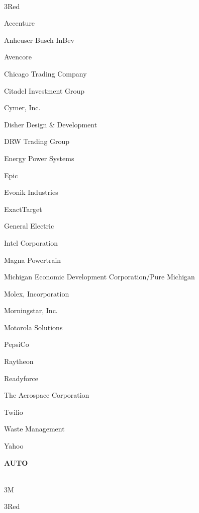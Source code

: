 \documentclass[twoside]{article}
\begin{document}
\begin{center}
\begin{multicols}{5}
        \vspace{-1em}
        ~\hrulefill~
        \vspace{-.9em}
        \begin{FlushLeft}
        \begin{compactitem}
        \item 3Red
\item Accenture
\item Anheuser Busch InBev
\item Avencore
\item Chicago Trading Company
\item Citadel Investment Group
\item Cymer, Inc.
\item Disher Design \& Development
\item DRW Trading Group
\item Energy Power Systems
\item Epic
\item Evonik Industries
\item ExactTarget
\item General Electric
\item Intel Corporation
\item Magna Powertrain
\item Michigan Economic Development Corporation/Pure Michigan
\item Molex, Incorporation
\item Morningstar, Inc.
\item Motorola Solutions
\item PepsiCo
\item Raytheon
\item Readyforce
\item The Aerospace Corporation
\item Twilio
\item Waste Management
\item Yahoo
\end{compactitem}
        \end{FlushLeft}
        \vspace{1em}
        {\fontsize{14}{16}\selectfont \bf AUTO}\\
        \vspace{-1em}
        ~\hrulefill~
        \vspace{-.9em}
        \begin{FlushLeft}
        \begin{compactitem}
        \item 3M
\item 3Red

\end{compactitem}
\end{FlushLeft}
\end{multicols}
\end{center}
\end{document}
